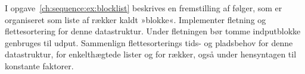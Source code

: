 \begin{exerc}
  I opgave~\ref{ch:sequence:ex:blocklist}
  beskrives en fremstilling af følger, som er organiseret som liste af rækker kaldt »blokke«.
  Implementer fletning og flettesortering for denne datastruktur.
  Under fletningen bør tomme indputblokke genbruges til udput.
  Sammenlign flettesorterings tids- og pladsbehov for denne datastruktur, for enkelthægtede lister og for rækker, også under hensyntagen til konstante faktorer.
\end{exerc}



